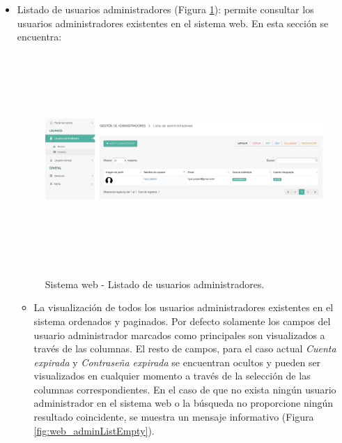 \documentclass[12pt,a4paper, twoside]{report}
\begin{document}
	\begin{itemize}
		\item Listado de usuarios administradores (Figura \ref{fig:web_adminList}): permite consultar los usuarios administradores existentes en el sistema web. En esta sección se encuentra:
		
		\begin{figure}[!ht]   
			\caption{Sistema web - Listado de usuarios administradores.} 
			\begin{center}
		 		\includegraphics[width=18cm, height=8cm]{Images/userGuide/web/adminList} \\
				\label{fig:web_adminList} 
			\end{center}  	
		\end{figure}
		
		\begin{itemize}
			\item La visualización de todos los usuarios administradores existentes en el sistema ordenados y paginados. Por defecto solamente los campos del usuario administrador marcados como principales son visualizados a través de las columnas. El resto de campos, para el caso actual \textit{Cuenta expirada} y \textit{Contraseña expirada} se encuentran ocultos y pueden ser visualizados en cualquier momento a través de la selección de las columnas correspondientes. En el caso de que no exista ningún usuario administrador en el sistema web o la búsqueda no proporcione ningún resultado coincidente, se muestra un mensaje informativo (Figura \ref{fig:web_adminListEmpty}).	
			

\end{itemize}
\end{itemize}
\end{document}
